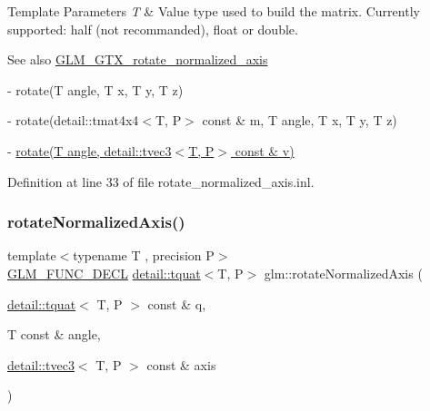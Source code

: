 \begin{DoxyTemplParams}{Template Parameters}
{\em T} & Value type used to build the matrix. Currently supported\+: half (not recommanded), float or double.\\
\hline
\end{DoxyTemplParams}
\begin{DoxySeeAlso}{See also}
\hyperlink{group__gtx__rotate__normalized__axis}{G\+L\+M\+\_\+\+G\+T\+X\+\_\+rotate\+\_\+normalized\+\_\+axis} 

-\/ rotate(\+T angle, T x, T y, T z) 

-\/ rotate(detail\+::tmat4x4$<$\+T, P$>$ const \& m, T angle, T x, T y, T z) 

-\/ \hyperlink{group__gtx__transform_gaac4ccdbf699a62fe6429005512c0cda5}{rotate(\+T angle, detail\+::tvec3$<$\+T, P$>$ const \& v)} 
\end{DoxySeeAlso}


Definition at line 33 of file rotate\+\_\+normalized\+\_\+axis.\+inl.

\mbox{\label{group__gtx__rotate__normalized__axis_ga774f0f09fc99b3a967001cb116aa7f2a}} 
\subsubsection{\texorpdfstring{rotate\+Normalized\+Axis()}{rotateNormalizedAxis()}\hspace{0.1cm}{\footnotesize\ttfamily [2/2]}}
{\footnotesize\ttfamily template$<$typename T , precision P$>$ \\
\hyperlink{setup_8hpp_ab2d052de21a70539923e9bcbf6e83a51}{G\+L\+M\+\_\+\+F\+U\+N\+C\+\_\+\+D\+E\+CL} \hyperlink{structglm_1_1detail_1_1tquat}{detail\+::tquat}$<$T, P$>$ glm\+::rotate\+Normalized\+Axis (\begin{DoxyParamCaption}\item[{\hyperlink{structglm_1_1detail_1_1tquat}{detail\+::tquat}$<$ T, P $>$ const \&}]{q,  }\item[{T const \&}]{angle,  }\item[{\hyperlink{structglm_1_1detail_1_1tvec3}{detail\+::tvec3}$<$ T, P $>$ const \&}]{axis }\end{DoxyParamCaption})}

